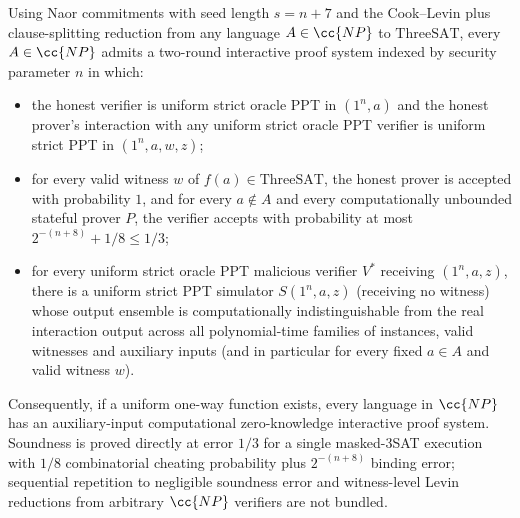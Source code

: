 \begin{result}
Using Naor commitments with seed length $s=n+7$ and the Cook--Levin plus clause-splitting
reduction from any language $A\in\cc{NP}$ to $\mathrm{ThreeSAT}$, every $A\in\cc{NP}$
admits a two-round interactive proof system indexed by security parameter $n$ in which:
\begin{itemize}
\item the honest verifier is uniform strict oracle PPT in $(1^n,a)$ and the honest
  prover's interaction with any uniform strict oracle PPT verifier is uniform strict
  PPT in $(1^n,a,w,z)$;
\item for every valid witness $w$ of $f(a)\in\mathrm{ThreeSAT}$, the honest prover is
  accepted with probability $1$, and for every $a\notin A$ and every computationally
  unbounded stateful prover $P$, the verifier accepts with probability at most
  $2^{-(n+8)}+1/8\le 1/3$;
\item for every uniform strict oracle PPT malicious verifier $V^*$ receiving $(1^n,a,z)$,
  there is a uniform strict PPT simulator $S(1^n,a,z)$ (receiving no witness) whose
  output ensemble is computationally indistinguishable from the real interaction output
  across all polynomial-time families of instances, valid witnesses and auxiliary inputs
  (and in particular for every fixed $a\in A$ and valid witness $w$).
\end{itemize}
Consequently, if a uniform one-way function exists, every language in $\cc{NP}$ has an
auxiliary-input computational zero-knowledge interactive proof system. Soundness is
proved directly at error $1/3$ for a single masked-3SAT execution with $1/8$ combinatorial
cheating probability plus $2^{-(n+8)}$ binding error; sequential repetition to negligible
soundness error and witness-level Levin reductions from arbitrary $\cc{NP}$ verifiers are
not bundled.\citep{Naor1991,GoldreichMicaliWigderson1991,Goldreich2001}
\end{result}

